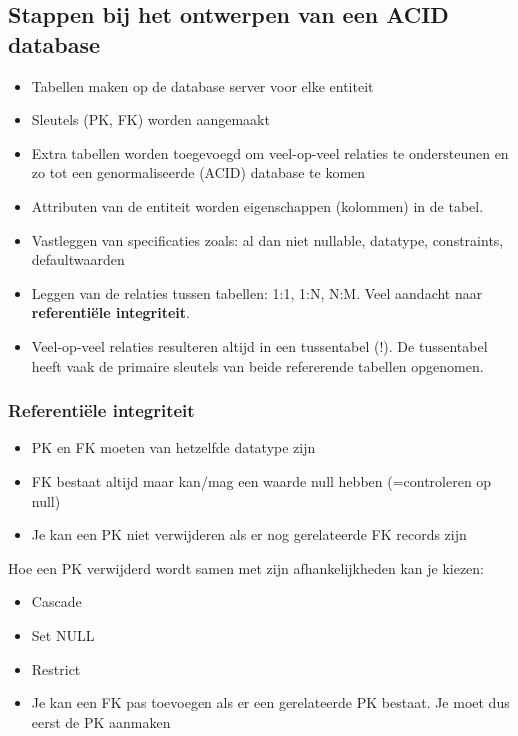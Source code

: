 \documentclass{article}
\newcommand{\bold}[1]{\textbf{#1}}
\begin{document}
\subsection{Stappen bij het ontwerpen van een ACID database}
\begin{itemize}
    \item Tabellen maken op de database server voor elke entiteit
    \item Sleutels (PK, FK) worden aangemaakt
    \item Extra tabellen worden toegevoegd om veel-op-veel relaties te ondersteunen en zo tot een genormaliseerde (ACID) database te komen
    \item Attributen van de entiteit worden eigenschappen (kolommen) in de tabel.
    \item Vastleggen van specificaties zoals: al dan niet nullable, datatype, constraints, defaultwaarden
    \item Leggen van de relaties tussen tabellen: 1:1, 1:N, N:M. Veel aandacht naar \bold{referentiële integriteit}. 
    \item Veel-op-veel relaties resulteren altijd in een tussentabel (!). De tussentabel heeft vaak de primaire sleutels van beide refererende tabellen opgenomen. 
\end{itemize}

\subsubsection{Referentiële integriteit}
\begin{itemize}
    \item PK en FK moeten van hetzelfde datatype zijn
    \item FK bestaat altijd maar kan/mag een waarde null hebben (=controleren op null)
    \item Je kan een PK niet verwijderen als er nog gerelateerde FK records zijn 
\end{itemize}

Hoe een PK verwijderd wordt samen met zijn afhankelijkheden kan je kiezen:
\begin{itemize}
    \item Cascade
    \item Set NULL
    \item Restrict
    \item Je kan een FK pas toevoegen als er een gerelateerde PK bestaat. Je moet dus eerst de PK aanmaken
\end{itemize}
\end{document}
